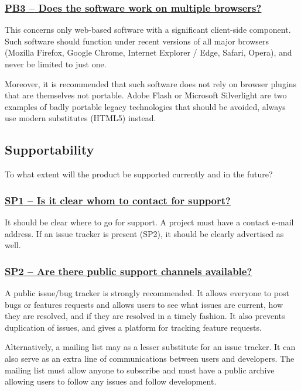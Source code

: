 \documentclass[a4paper,11pt]{article}
\newcommand{\criterion}[1]{\subsubsection*{\underline{#1}}}
\begin{document}
\newcommand{\pbThreeID}{PB3}
\newcommand{\pbThreeText}{Does the software work on multiple browsers?}
\criterion{\pbThreeID{ }--{ }\pbThreeText}\label{id:pb3} 

This concerns only web-based software with a significant client-side component.
Such software should function under recent versions of all major browsers
(Mozilla Firefox, Google Chrome, Internet Explorer / Edge, Safari, Opera), and
never be limited to just one.

Moreover, it is recommended that such software does not rely on browser plugins that
are themselves not portable. Adobe Flash or Microsoft Silverlight are two
examples of badly portable legacy technologies that should be avoided, always use
modern substitutes (HTML5) instead.

\subsection{Supportability}\label{sec:sup}

To what extent will the product be supported currently and in the future?

\newcommand{\spOneID}{SP1}
\newcommand{\spOneText}{Is it clear whom to contact for support?}
\criterion{\spOneID{ }--{ }\spOneText}\label{id:sp1} 

It should be clear where to go for support. A project must have a contact
e-mail address. If an issue tracker is present (SP2), it should be clearly advertised
as well.

\newcommand{\spTwoID}{SP2}
\newcommand{\spTwoText}{Are there public support channels available?}
\criterion{\spTwoID{ }--{ }\spTwoText}\label{id:sp2} 

A public issue/bug tracker is strongly recommended. It allows everyone to post
bugs or features requests and allows users to see what issues are current, how
they are resolved, and if they are resolved in a timely fashion. It also
prevents duplication of issues, and gives a platform for
tracking feature requests.

Alternatively, a mailing list may as a lesser substitute for an issue tracker.
It can also serve as an extra line of communications between users
and developers. The mailing list must allow anyone to subscribe and must have a
public archive allowing users to follow any issues and follow development.
\end{document}
